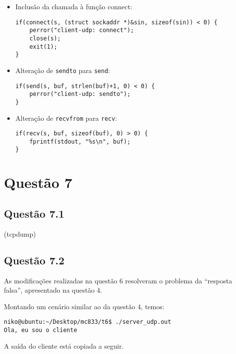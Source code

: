 \documentclass[a4paper,10pt]{article}
\begin{document}
\begin{itemize}

\item Inclusão da chamada à função connect:

\begin{lstlisting}
if(connect(s, (struct sockaddr *)&sin, sizeof(sin)) < 0) {
    perror("client-udp: connect");
    close(s);
    exit(1);
}
\end{lstlisting}

\item Alteração de {\tt sendto} para {\tt send}:

\begin{lstlisting}
if(send(s, buf, strlen(buf)+1, 0) < 0) {
    perror("client-udp: sendto");
}
\end{lstlisting}

\item Alteração de {\tt recvfrom} para {\tt recv}:

\begin{lstlisting}
if(recv(s, buf, sizeof(buf), 0) > 0) {
    fprintf(stdout, "%s\n", buf);
}
\end{lstlisting}

\end{itemize}

\section{Questão 7}
\subsection{Questão 7.1}
(tcpdump)

\subsection{Questão 7.2}
As modificações realizadas na questão 6 resolveram o problema da ``resposta falsa'', apresentado na questão 4.

Montando um cenário similar ao da questão 4, temos:

\begin{lstlisting}
niko@ubuntu:~/Desktop/mc833/t6$ ./server_udp.out
Ola, eu sou o cliente

\end{lstlisting}

A saída do cliente está copiada a seguir.
\end{document}
